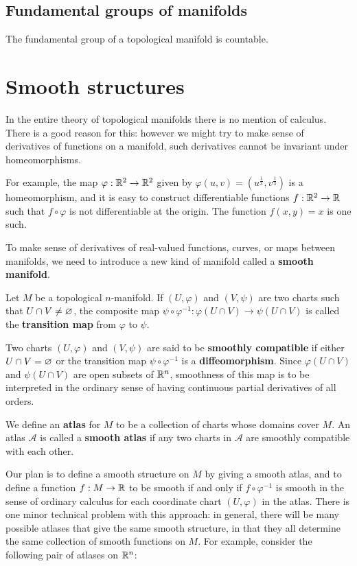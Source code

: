 \subsection{Fundamental groups of manifolds}
\begin{proposition}
The fundamental group of a topological manifold is countable.
\end{proposition}
\section{Smooth structures}
In the entire theory of topological manifolds there is no mention of calculus. There is a good reason for this: however we might try to make
sense of derivatives of functions on a manifold, such derivatives cannot be invariant under homeomorphisms.\par 
For example, the map $\varphi:\mathbb{R}^2\to\mathbb{R}^2$ given by $\varphi(u,v)=(u^{\frac{1}{3}},v^{\frac{1}{3}})$ is a homeomorphism, and it is easy to construct differentiable functions $f:\mathbb{R}^2\to\mathbb{R}$ such that $f\circ\varphi$ is not differentiable at the origin. The function $f(x,y)=x$ is one such.\par
To make sense of derivatives of real-valued functions, curves, or maps between manifolds, we need to introduce a new kind of manifold called a \textbf{smooth manifold}.
\begin{definition}
Let $M$ be a topological $n$-manifold. If $(U,\varphi)$ and $(V,\psi)$ are two charts such that $U\cap V\neq\varnothing$, the composite map $\psi\circ\varphi^{-1}:\varphi(U\cap V)\to\psi(U\cap V)$ is called the
\textbf{transition map} from $\varphi$ to $\psi$.\par
Two charts $(U,\varphi)$ and $(V,\psi)$ are said to be \textbf{smoothly compatible} if either $U\cap V=\varnothing$ or the transition map $\psi\circ\varphi^{-1}$ is a \textbf{diffeomorphism}. Since $\varphi(U\cap V)$ and $\psi(U\cap V)$ are open subsets of $\mathbb{R}^n$, smoothness of this map is to be interpreted in the ordinary sense of having continuous partial derivatives of all orders.
\end{definition}
\begin{definition}
We define an \textbf{atlas} for $M$ to be a collection of charts whose domains cover $M$. An atlas $\mathcal{A}$ is called a \textbf{smooth atlas} if any two charts in $\mathcal{A}$ are smoothly compatible with each other.
\end{definition}
Our plan is to define a smooth structure on $M$ by giving a smooth atlas, and to define a function $f:M\to\mathbb{R}$ to be smooth if and only if $f\circ\varphi^{-1}$ is smooth in the sense of ordinary calculus for each coordinate chart $(U,\varphi)$ in the atlas. There is one minor technical problem with this approach: in general, there will be many possible atlases that give the same smooth structure, in that they all determine the same collection of smooth functions on $M$. For example, consider the following pair of atlases on $\mathbb{R}^n$:
